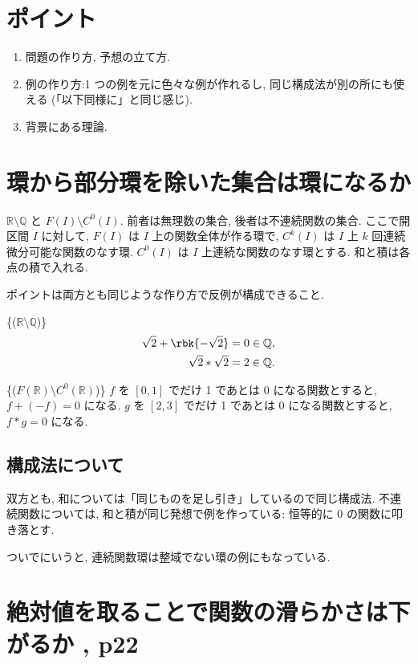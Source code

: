 \documentclass[openany, a4paper, oneside]{jsbook}
\begin{document}
\section{ポイント}

\begin{enumerate}
\item 問題の作り方, 予想の立て方.
\item 例の作り方:1 つの例を元に色々な例が作れるし, 同じ構成法が別の所にも使える (「以下同様に」と同じ感じ).
\item 背景にある理論.
\end{enumerate}
\section{環から部分環を除いた集合は環になるか}

$\mathbb{R} \setminus \mathbb{Q}$ と $F (I) \setminus C^0 (I)$.
前者は無理数の集合, 後者は不連続関数の集合.
ここで開区間 $I$ に対して, $F (I)$ は $I$ 上の関数全体が作る環で,
$C^k (I)$ は $I$ 上 $k$ 回連続微分可能な関数のなす環.
$C^0 (I)$ は $I$ 上連続な関数のなす環とする.
和と積は各点の積で入れる.

ポイントは両方とも同じような作り方で反例が構成できること.
\begin{ex}\textup\{($\mathbb{R} \setminus \mathbb{Q}$)\}
\begin{align}
 \sqrt{2} + \rbk{- \sqrt{2}} &= 0 \in \mathbb{Q}, \\
 \sqrt{2} * \sqrt{2} &= 2 \in \mathbb{Q}.
\end{align}
\end{ex}
\begin{ex}\textup\{($F (\mathbb{R}) \setminus C^0 (\mathbb{R})$)\}
$f$ を $[0,1]$ でだけ 1 であとは 0 になる関数とすると, $f + (-f) = 0$ になる.
$g$ を $[2,3]$ でだけ 1 であとは 0 になる関数とすると, $f * g = 0$ になる.
\end{ex}
\subsection{構成法について}

双方とも, 和については「同じものを足し引き」しているので同じ構成法.
不連続関数については, 和と積が同じ発想で例を作っている: 恒等的に 0 の関数に叩き落とす.

ついでにいうと, 連続関数環は整域でない環の例にもなっている.
\section{絶対値を取ることで関数の滑らかさは下がるか \cite{GelbaumOlmsted1}, p22}
\end{document}
